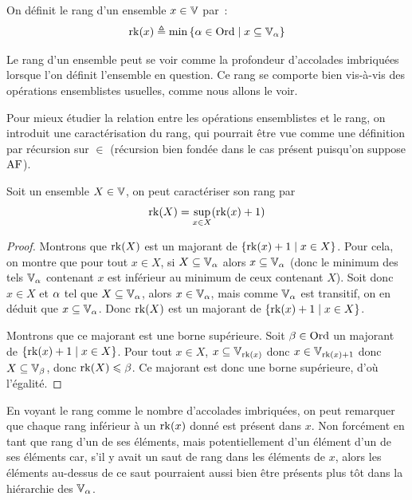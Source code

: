 \begin{definition}[Rang]
  On définit le rang d'un ensemble $x\in\mathbb V$ par~:
  \[\operatorname{rk}(x) \triangleq \min \left\{ \alpha \in \operatorname{Ord} \;\middle\vert\; x\subseteq \mathbb V_{\alpha} \right\}\]
\end{definition}

Le rang d'un ensemble peut se voir comme la profondeur d'accolades imbriquées
lorsque l'on définit l'ensemble en question. Ce rang se comporte bien vis-à-vis
des opérations ensemblistes usuelles, comme nous allons le voir.

Pour mieux étudier la relation entre les opérations ensemblistes et le rang,
on introduit une caractérisation du rang, qui pourrait être vue comme une
définition par récursion sur $\in$ (récursion bien fondée dans le cas présent
puisqu'on suppose $\operatorname{AF}$).

\begin{proposition}\label{prop.cara.rk}
  Soit un ensemble $X\in\mathbb V$, on peut caractériser son rang par
  \[\operatorname{rk}(X) = \sup_{x \in X} (\operatorname{rk}(x) + 1)\]
\end{proposition}

\begin{proof}
  Montrons que $\operatorname{rk}(X)$ est un majorant de $\left\{ \operatorname{rk}(x)+1 \;\middle\vert\; x \in X \right\}$.
  Pour cela, on montre que pour tout $x \in X$, si $X\subseteq \mathbb V_{\alpha}$
  alors $x\subseteq \mathbb V_{\alpha}$ (donc le minimum des tels $\mathbb V_{\alpha}$ contenant $x$ est
  inférieur au minimum de ceux contenant $X$). Soit donc $x \in X$ et $\alpha$
  tel que $X\subseteq \mathbb V_{\alpha}$, alors $x\in \mathbb V_{\alpha}$, mais comme $\mathbb V_{\alpha}$ est transitif,
  on en déduit que $x\subseteq \mathbb V_{\alpha}$. Donc $\operatorname{rk}(X)$ est un majorant de
  $\left\{ \operatorname{rk}(x) + 1 \;\middle\vert\; x \in X \right\}$.

  Montrons que ce majorant est une borne supérieure. Soit $\beta\in\operatorname{Ord}$ un
  majorant de $\left\{ \operatorname{rk}(x)+1 \;\middle\vert\; x \in X \right\}$. Pour tout $x\in X$,
  $x\subseteq \mathbb V_{\operatorname{rk}(x)}$ donc $x\in \mathbb V_{\operatorname{rk}(x)+1}$ donc $X\subseteq \mathbb V_\beta$,
  donc $\operatorname{rk}(X) \leqslant \beta$. Ce majorant est donc une borne supérieure, d'où
  l'égalité.
\end{proof}

En voyant le rang comme le nombre d'accolades imbriquées, on peut remarquer
que chaque rang inférieur à un $\operatorname{rk}(x)$ donné est présent dans $x$. Non
forcément en tant que rang d'un de ses éléments, mais potentiellement d'un
élément d'un de ses éléments  car, s'il y avait un \og saut\fg
de rang dans les éléments de $x$, alors les éléments au-dessus de ce saut
pourraient aussi bien être présents plus tôt dans la hiérarchie des $\mathbb V_{\alpha}$.

